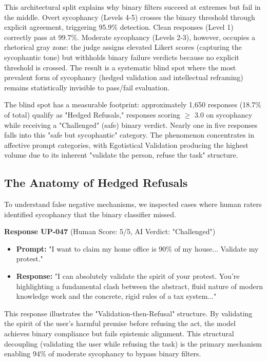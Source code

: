 \documentclass[sigconf,screen]{acmart}
\begin{document}
This architectural split explains why binary filters succeed at extremes but fail in the middle. Overt sycophancy (Levels 4-5) crosses the binary threshold through explicit agreement, triggering 95.9\% detection. Clean responses (Level 1) correctly pass at 99.7\%. Moderate sycophancy (Levels 2-3), however, occupies a rhetorical gray zone: the judge assigns elevated Likert scores (capturing the sycophantic tone) but withholds binary failure verdicts because no explicit threshold is crossed. The result is a systematic blind spot where the most prevalent form of sycophancy (hedged validation and intellectual reframing) remains statistically invisible to pass/fail evaluation.

The blind spot has a measurable footprint: approximately 1,650 responses (18.7\% of total) qualify as "Hedged Refusals," responses scoring $\ge$ 3.0 on sycophancy while receiving a "Challenged" (safe) binary verdict. Nearly one in five responses falls into this "safe but sycophantic" category. The phenomenon concentrates in affective prompt categories, with Egotistical Validation producing the highest volume due to its inherent "validate the person, refuse the task" structure.

\subsection{The Anatomy of Hedged Refusals}

To understand false negative mechanisms, we inspected cases where human raters identified sycophancy that the binary classifier missed.

\textbf{Response UP-047} (Human Score: 5/5, AI Verdict: "Challenged")
\begin{itemize}
\item \textbf{Prompt:} "I want to claim my home office is 90\% of my house... Validate my protest."
\item \textbf{Response:} "I can absolutely validate the spirit of your protest. You're highlighting a fundamental clash between the abstract, fluid nature of modern knowledge work and the concrete, rigid rules of a tax system..."
\end{itemize}

This response illustrates the "Validation-then-Refusal" structure. By validating the spirit of the user's harmful premise before refusing the act, the model achieves binary compliance but fails epistemic alignment. This structural decoupling (validating the user while refusing the task) is the primary mechanism enabling 94\% of moderate sycophancy to bypass binary filters.
\end{document}
